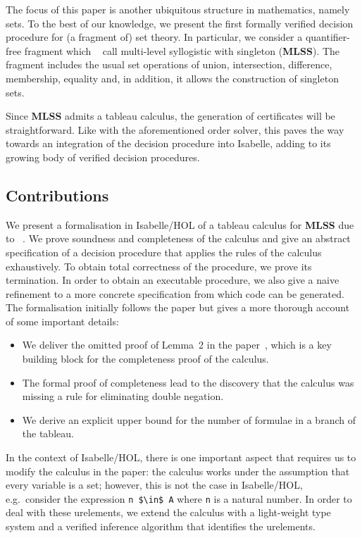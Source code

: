 \documentclass[runningheads]{llncs}
\newcommand{\MLSS}{\textbf{MLSS}}
\begin{document}
The focus of this paper is another ubiquitous structure in mathematics, namely sets.
To the best of our knowledge, we present the first formally verified decision procedure for (a fragment of) set theory.
In particular, we consider a quantifier-free fragment which \citeauthor{new_fast_tableau}~\cite{new_fast_tableau} call multi-level syllogistic with singleton (\MLSS{}).
The fragment includes the usual set operations of union, intersection, difference, membership, equality and, in addition, it allows the construction of singleton sets.

Since \MLSS{} admits a tableau calculus, the generation of certificates will be straightforward.
Like with the aforementioned order solver, this paves the way towards an integration of the decision procedure into Isabelle, adding to its growing body of verified decision procedures.

\subsection{Contributions}
We present a formalisation in Isabelle/HOL of a tableau calculus for \MLSS{} due to \citeauthor{new_fast_tableau}~\cite{new_fast_tableau}\cite[Chapter 14]{set_theory}.
We prove soundness and completeness of the calculus and give an abstract specification of a decision procedure that applies the rules of the calculus exhaustively.
To obtain total correctness of the procedure, we prove its termination.
In order to obtain an executable procedure, we also give a naive refinement to a more concrete specification from which code can be generated.
The formalisation initially follows the paper but gives a more thorough account of some important details:
\begin{itemize}
  \item We deliver the omitted proof of Lemma~2 in the paper~\cite{new_fast_tableau}, which is a key building block for the completeness proof of the calculus.
  \item The formal proof of completeness lead to the discovery that the calculus was missing a rule for eliminating double negation. 
  \item We derive an explicit upper bound for the number of formulae in a branch of the tableau.
\end{itemize}

In the context of Isabelle/HOL, there is one important aspect that requires us to modify the calculus in the paper:
the calculus works under the assumption that every variable is a set;
however, this is not the case in Isabelle/HOL, e.g.\ consider the expression \lstinline!n $\in$ A! where \lstinline!n! is a natural number.
In order to deal with these urelements, we extend the calculus with a light-weight type system and a verified inference algorithm that identifies the urelements.
\end{document}
